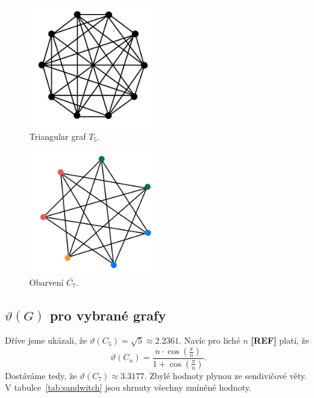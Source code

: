 \begin{figure}[h!]
    \centering
    \includegraphics[width=0.5\textwidth]{img/complement_petersen.jpeg}   
    \caption{Triangular graf $T_5$.}
    \label{fig:complement_petersen}
\end{figure}

\begin{figure}[h!]
    \centering
    \includegraphics[width=0.5\textwidth]{img/complement_c7.jpeg}   
    \caption{Obarvení $\bar{C_7}$.}
    \label{fig:complement_c7}
\end{figure}

\subsection*{$\vartheta(G)$ pro vybrané grafy}

Dříve jsme ukázali, že $\vartheta(C_5) = \sqrt{5} \approx 2.2361$. Navíc pro liché $n$ \textbf{[REF]} platí, že
\begin{equation}
    \vartheta(C_n) = \frac{n \cdot \cos(\frac{\pi}{n})}{1 + \cos(\frac{\pi}{n})}.
    \label{eq:cycle_theta}
\end{equation}
Dostáváme tedy, že $\vartheta({C_7}) \approx 3.3177$. Zbylé hodnoty plynou ze sendivičové věty. V tabulce~\ref{tab:sandwitch} jsou shrnuty všechny zmíněné hodnoty.

